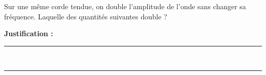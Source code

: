 Sur une même corde tendue, on double l'amplitude de l'onde sans changer sa fréquence. Laquelle des quantités suivantes double ?

\choices

\noindent\textbf{Justification :} \hrulefill \\[2.5ex]
\rule{\linewidth}{0.4pt} \\[2.5ex]
\rule{\linewidth}{0.4pt}
\vfill
